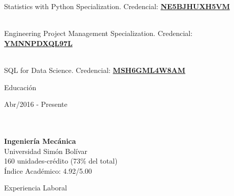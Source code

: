 \documentclass[10pt]{article}
\begin{document}
\begin{multicols}{2}
\begin{vwcol}[widths={0.235,0.765}, sep=.8cm,rule=0pt,indent=0em,lines=9]
        Statistics with Python Specialization. Credencial: \href{https://www.coursera.org/account/accomplishments/specialization/certificate/NE5BJHUXH5VM}{\textbf{NE5BJHUXH5VM}}\par\hfill\\
        Engineering Project Management Specialization. Credencial: \href{https://www.coursera.org/account/accomplishments/specialization/certificate/YMNNPDXQL97L}{\textbf{YMNNPDXQL97L}}\par\hfill\\
        SQL for Data Science. Credencial: \href{https://www.coursera.org/account/accomplishments/certificate/MSH6GML4W8AM}{\textbf{MSH6GML4W8AM}}\par\vspace{5px}
    \end{vwcol}
\end{multicols}

\begin{LARGE}
    \color{blue!50!black} Educación\par
\end{LARGE}
\begin{multicols}{2}
     \begin{vwcol}[widths={0.4,0.6}, sep=.2cm,rule=0pt,indent=0em,lines=4]
    \hspace{5pt}Abr/2016 - Presente\\
    \hfill\\
    \hfill\\
    \hfill\par
    \textbf{Ingeniería Mecánica}\\
    Universidad Simón Bolívar\\
    160 unidades-crédito (73\% del total)\\
    Índice Académico: 4.92/5.00
    \end{vwcol}
\end{multicols}


\begin{LARGE}
    \color{blue!50!black} Experiencia Laboral\par
\end{LARGE}
\end{document}
